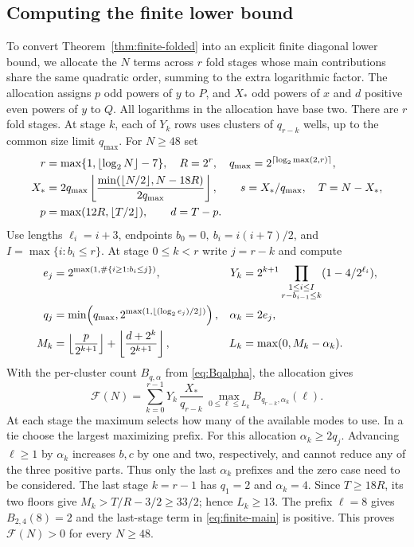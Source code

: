 \subsection{Computing the finite lower bound}\label{sec:recipe}
To convert Theorem~\ref{thm:finite-folded} into an explicit finite diagonal lower bound, we allocate the \(N\) terms across \(r\) fold stages whose main contributions share the same quadratic order, summing to the extra logarithmic factor. The allocation assigns \(p\) odd powers of \(y\) to \(P\), and \(X_*\) odd powers of \(x\) and \(d\) positive even powers of \(y\) to \(Q\). All logarithms in the allocation have base two. There are \(r\) fold stages. At stage \(k\), each of \(Y_k\) rows uses clusters of \(q_{r-k}\) wells, up to the common size limit \(q_{\max}\). For \(N\ge48\) set
\begin{align}
 r&=\max\{1,\lfloor\log_2 N\rfloor-7\},\quad R=2^r,\quad
 q_{\max}=2^{\lceil\log_2\max(2,r)\rceil},\notag\\
 X_*&=2q_{\max}\left\lfloor\frac{\min(\lfloor N/2\rfloor,N-18R)}{2q_{\max}}\right\rfloor,\qquad
 s=X_*/q_{\max},\quad T=N-X_*,\notag\\
 p&=\max(12R,\lfloor T/2\rfloor),\qquad d=T-p. \label{eq:allocation}
\end{align}
Use lengths \(\ell_i=i+3\), endpoints \(b_0=0,\ b_i=i(i+7)/2\), and \(I=\max\{i:b_i\le r\}\). At stage \(0\le k<r\) write \(j=r-k\) and compute
\begin{align}
 e_j&=2^{\max(1,\#\{i\ge1:b_i\le j\})},&
 Y_k&=2^{k+1}\prod_{\substack{1\le i\le I\\r-b_{i-1}\le k}}(1-4/2^{\ell_i}),\notag\\
 q_j&=\min\!\left(q_{\max},2^{\max(1,\lfloor(\log_2e_j)/2\rfloor)}\right),&
 \alpha_k&=2e_j,\notag\\
 M_k&=\left\lfloor\frac p{2^{k+1}}\right\rfloor+
       \left\lfloor\frac{d+2^k}{2^{k+1}}\right\rfloor,&
 L_k&=\max(0,M_k-\alpha_k). \label{eq:recipe-stages}
\end{align}
With the per-cluster count \(B_{q,\alpha}\) from \eqref{eq:Bqalpha}, the allocation gives
\begin{equation}\label{eq:finite-main}
 \mathcal F(N)=\sum_{k=0}^{r-1}Y_k\,\frac{X_*}{q_{r-k}}\,
          \max_{0\le\ell\le L_k}B_{q_{r-k},\alpha_k}(\ell).
\end{equation}
At each stage the maximum selects how many of the available modes to use. In a tie choose the largest maximizing prefix. For this allocation \(\alpha_k\ge2q_j\). Advancing \(\ell\ge1\) by \(\alpha_k\) increases \(b,c\) by one and two, respectively, and cannot reduce any of the three positive parts. Thus only the last \(\alpha_k\) prefixes and the zero case need to be considered.
The last stage \(k=r-1\) has \(q_1=2\) and \(\alpha_k=4\). Since \(T\ge18R\), its two floors give \(M_k>T/R-3/2\ge 33/2\); hence \(L_k\ge13\). The prefix \(\ell=8\) gives \(B_{2,4}(8)=2\) and the last-stage term in \eqref{eq:finite-main} is positive. This proves \(\mathcal F(N)>0\) for every \(N\ge48\).

